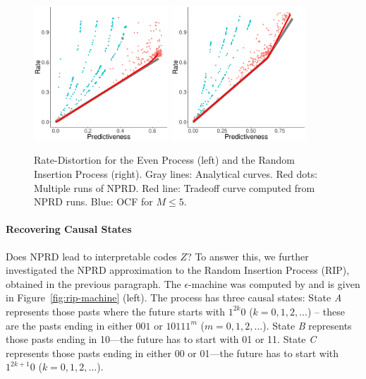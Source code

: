 \documentclass[entropy,article,submit,moreauthors,pdftex,10pt,a4paper]{Definitions/mdpi}
\begin{document}
\begin{figure}
\centering
\includegraphics[width=0.45\textwidth]{code/figures/even-info.pdf}
\includegraphics[width=0.45\textwidth]{code/figures/rip-info.pdf}

	\caption{Rate-Distortion for the Even Process (left) and the Random Insertion Process (right). Gray lines: Analytical curves. Red dots: Multiple runs of NPRD. Red line: Tradeoff curve computed from NPRD runs. Blue: OCF for $M\leq 5$. }\label{fig:even}
\end{figure}

\paragraph{Recovering Causal States}
Does NPRD lead to interpretable codes $Z$?
To answer this, we further investigated the NPRD approximation to the Random Insertion Process (RIP), obtained in the previous paragraph.
The $\epsilon$-machine was computed by  \citet{marzen-predictive-2016} and is given in Figure~\ref{fig:rip-machine} (left).
The process has three causal states:
State \textit{A} represents those pasts where the future starts with $1^{2k}0$ ($k = 0, 1, 2, \dots$) -- these are the pasts ending in either $001$ or $10111^m$ ($m= 0, 1, 2, \dots$). %
State \textit{B} represents those pasts ending in 10---the future has to start with 01 or 11.
State \textit{C} represents those pasts ending in either 00 or 01---the future has to start with $1^{2k+1}0$ ($k = 0, 1, 2, \dots$).
\end{document}
